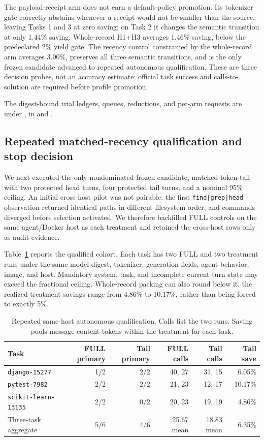 \documentclass[11pt]{article}
\begin{document}
The payload-receipt arm does not earn a default-policy promotion.  Its
tokenizer gate correctly abstains whenever a receipt would not be smaller than
the source, leaving Tasks 1 and 3 at zero saving; on Task 2 it changes the
semantic transition at only 1.44\% saving.  Whole-record H1+H3 averages 1.46\%
saving, below the predeclared 2\% yield gate.  The recency control constrained
by the whole-record arm averages 3.00\%, preserves all three semantic
transitions, and is the only frozen candidate advanced to repeated autonomous
qualification.  These are three decision probes, not an accuracy estimate;
official task success and calls-to-solution are required before profile
promotion.

The digest-bound trial ledgers, queues, reductions, and per-arm requests are
under , in
 and .

\subsection{Repeated matched-recency qualification and stop decision}

We next executed the only nondominated frozen candidate, matched token-tail
with two protected head turns, four protected tail turns, and a nominal 95\%
ceiling. An initial cross-host pilot was not pairable: the first
\texttt{find|grep|head} observation returned identical paths in different
filesystem order, and commands diverged before selection activated. We
therefore backfilled FULL controls on the same agent/Docker host as each
treatment and retained the cross-host rows only as audit evidence.

Table~\ref{tab:tail95-repeat} reports the qualified cohort. Each task has two
FULL and two treatment runs under the same model digest, tokenizer, generation
fields, agent behavior, image, and host. Mandatory system, task, and incomplete
current-turn state may exceed the fractional ceiling. Whole-record packing can
also round below it: the realized treatment savings range from 4.86\% to
10.17\%, rather than being forced to exactly 5\%.

\begin{table}[H]
\centering
\scriptsize
\caption{Repeated same-host autonomous qualification. Calls list the two
runs. Saving pools message-content tokens within the treatment for each task.}
\label{tab:tail95-repeat}
\begin{tabular}{lrrrrr}
\toprule
Task & FULL primary & Tail primary & FULL calls & Tail calls & Tail save \\
\midrule
\texttt{django-15277} & 1/2 & 2/2 & 40, 27 & 31, 15 & 6.05\% \\
\texttt{pytest-7982} & 2/2 & 2/2 & 21, 23 & 12, 17 & 10.17\% \\
\texttt{scikit-learn-13135} & 2/2 & 0/2 & 20, 23 & 19, 19 & 4.86\% \\
\midrule
Three-task aggregate & 5/6 & 4/6 & 25.67 mean & 18.83 mean & 6.35\% \\
\bottomrule
\end{tabular}
\end{table}
\end{document}
